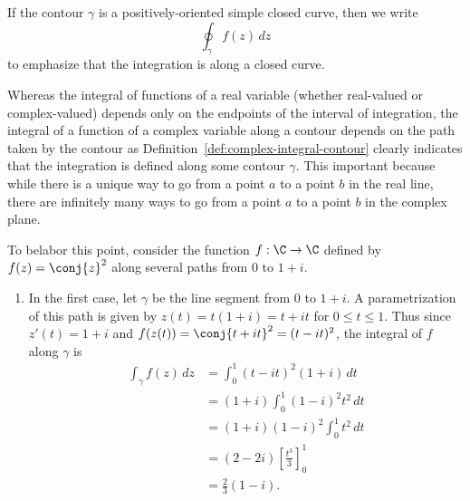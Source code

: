 If the contour \(\gamma\) is a positively-oriented simple closed curve, then we write
\[
    \oint_\gamma f(z) \, dz
\]
to emphasize that the integration is along a closed curve.

\begin{example}
    \label{ex:complex-integral-contour-different-paths}
    Whereas the integral of functions of a real variable (whether real-valued or
    complex-valued) depends only on the endpoints of the interval of
    integration, the integral of a function of a complex variable along a
    contour depends on the path taken by the contour as
    Definition~\ref{def:complex-integral-contour} clearly indicates that the
    integration is defined along some contour \(\gamma\). This important because
    while there is a unique way to go from a point \(a\) to a point \(b\) in the
    real line, there are infinitely many ways to go from a point \(a\) to a
    point \(b\) in the complex plane.
    
    To belabor this point, consider the function \(f : \C \to \C\) defined by
    \(f(z) = \conj{z}^2\) along several paths from \(0\) to \(1 + i\). 
    \begin{enumerate}[label=(\alph*), wide, nosep]
        \item In the first case, let \(\gamma\) be the line segment from \(0\)
        to \(1 + i\). A parametrization of this path is given by \(z(t) = t(1 +
        i) = t + it\) for \(0 \leq t \leq 1\). Thus since \(z'(t) = 1 + i\) and
        \(f(z(t)) = \conj{t + it}^2 = (t - it)^2\), the integral of \(f\) along
        \(\gamma\) is
        \[
            \begin{aligned}
                \int_\gamma f(z) \, dz &= \int_0^1 (t - it)^2 (1 + i) \, dt \\
                &= (1 + i) \int_0^1 (1 - i)^2 t^2 \, dt \\
                &= (1 + i)(1 - i)^2 \int_0^1 t^2 \, dt \\
                &= (2 - 2i) \left[ \frac{t^3}{3} \right]_0^1 \\
                &= \frac{2}{3}(1 - i).
            \end{aligned}
        \]


\end{enumerate}
\end{example}
